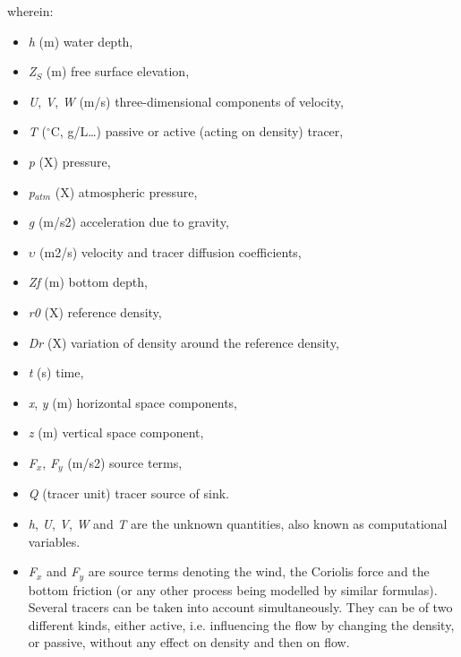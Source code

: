 wherein:
\begin{itemize}
\item \textit{h} (m) water depth,

\item \textit{Z${}_{S}$} (m) free surface elevation,

\item \textit{U}, \textit{V}, \textit{W} (m/s) three-dimensional components of
velocity,

\item \textit{T} (${}^\circ$C, g/L\dots ) passive or active (acting on density)
tracer,

\item \textit{p} (X) pressure,

\item \textit{p${}_{atm}$} (X) atmospheric pressure,

\item \textit{g} (m/s2) acceleration due to gravity,

\item $\upsilon$ (m2/s) velocity and tracer diffusion coefficients,

\item \textit{Zf} (m) bottom depth,

\item \textit{r0} (X) reference density,

\item \textit{Dr} (X) variation of density around the reference density,

\item \textit{t} (s) time,

\item \textit{x}, \textit{y} (m) horizontal space components,

\item \textit{z} (m) vertical space component,

\item \textit{F${}_{x}$}, \textit{F${}_{y}$} (m/s2) source terms,

\item \textit{Q} (tracer unit) tracer source of sink.

\item \textit{h}, \textit{U}, \textit{V}, \textit{W} and \textit{T} are the unknown
quantities, also known as computational variables.

\item \textit{F${}_{x}$} and \textit{F${}_{y}$} are source terms denoting the wind,
the Coriolis force and the bottom friction (or any other process being modelled
by similar formulas). Several tracers can be taken into account simultaneously.
They can be of two different kinds, either active, i.e. influencing the flow by
changing the density, or passive, without any effect on density and then on
flow.
\end{itemize}

